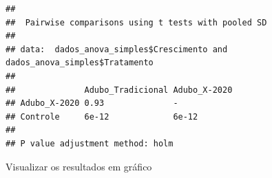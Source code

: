 \documentclass[
]{book}
\newenvironment{Shaded}{\begin{snugshade}}{\end{snugshade}}
\newcommand{\CommentTok}[1]{\textcolor[rgb]{0.56,0.35,0.01}{\textit{#1}}}
\newcommand{\KeywordTok}[1]{\textcolor[rgb]{0.13,0.29,0.53}{\textbf{#1}}}
\newcommand{\NormalTok}[1]{#1}
\newcommand{\OperatorTok}[1]{\textcolor[rgb]{0.81,0.36,0.00}{\textbf{#1}}}
\begin{document}
\begin{Shaded}
\end{Shaded}

\begin{verbatim}
## 
## 	Pairwise comparisons using t tests with pooled SD 
## 
## data:  dados_anova_simples$Crescimento and dados_anova_simples$Tratamento 
## 
##              Adubo_Tradicional Adubo_X-2020
## Adubo_X-2020 0.93              -           
## Controle     6e-12             6e-12       
## 
## P value adjustment method: holm
\end{verbatim}

Visualizar os resultados em gráfico
\end{document}
